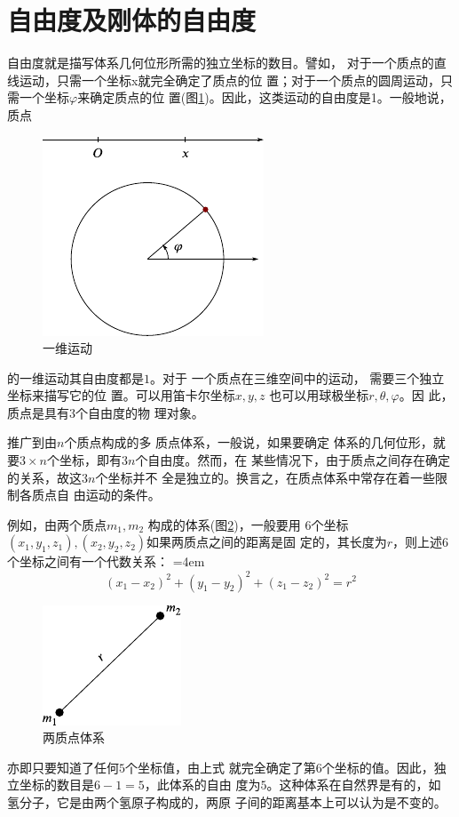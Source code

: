 \section{自由度及刚体的自由度}\label{sec:10.01}

自由度就是描写体系几何位形所需的独立坐标的数目。譬如，
对于一个质点的直线运动，只需一个坐标x就完全确定了质点的位
置；对于一个质点的圆周运动，只需一个坐标$ \varphi $来确定质点的位
置(图\ref{fig:10.01})。因此，这类运动的自由度是1。一般地说，质点
\begin{figure}
    \centering
    \includegraphics{figure/fig10.01}
    \caption{一维运动}
    \label{fig:10.01}
\end{figure}
的一维运动其自由度都是$ 1 $。对于
一个质点在三维空间中的运动，
需要三个独立坐标来描写它的位
置。可以用笛卡尔坐标$ x,y,z $
也可以用球极坐标$ r, \theta , \varphi $。因
此，质点是具有$ 3 $个自由度的物
理对象。

推广到由$ n $个质点构成的多
质点体系，一般说，如果要确定
体系的几何位形，就要$ 3 \times n $个坐标，即有$ 3n $个自由度。然而，在
某些情况下，由于质点之间存在确定的关系，故这$ 3n $个坐标并不
全是独立的。换言之，在质点体系中常存在着一些限制各质点自
由运动的条件。

例如，由两个质点$ m _ 1, m _ { 2 }  $ 构成的体系(图\ref{fig:10.02})，一般要用
$ 6 $个坐标$  \left( x _ { 1 } , y _ { 1 } , z _ { 1 } \right) ,\left(x_2,y_2,z_2\right) $如果两质点之间的距离是固
定的，其长度为$ r $，则上述$ 6 $个坐标之间有一个代数关系：
\begingroup
\mathindent=4em
\begin{equation}\label{eqn:10.01.01}
    \left( x _ { 1 } - x _ { 2 } \right) ^ { 2 } + \left( y _ { 1 } - y _ { 2 } \right) ^ { 2 } + \left( z _ { 1 } - z _ { 2 } \right) ^ { 2 } = r ^ { 2 }
\end{equation}
\endgroup
\begin{figure}
    \centering
    \includegraphics{figure/fig10.02}
    \caption{两质点体系}
    \label{fig:10.02}
\end{figure}
亦即只要知道了任何$ 5 $个坐标值，由上式
就完全确定了第$ 6 $个坐标的值。因此，独
立坐标的数目是$ 6-1=5 $，此体系的自由
度为$ 5 $。这种体系在自然界是有的，如
氢分子，它是由两个氢原子构成的，两原
子间的距离基本上可以认为是不变的。

